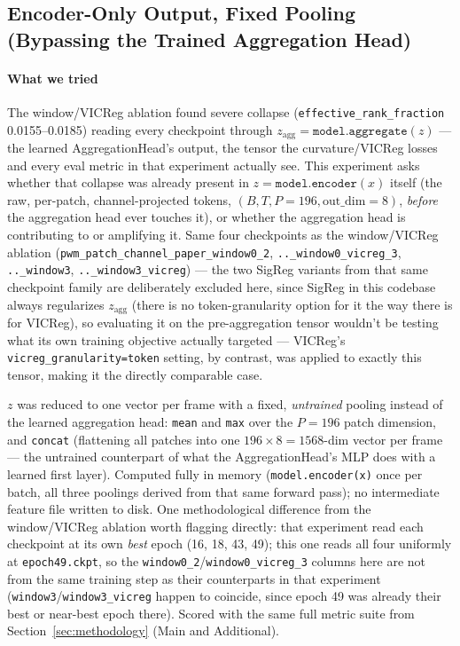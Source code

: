 \subsection{Encoder-Only Output, Fixed Pooling (Bypassing the Trained Aggregation Head)}
\label{exp:encoder-only-pooling}

\paragraph{What we tried} The window/VICReg ablation found severe collapse
(\texttt{effective\_rank\_fraction} 0.0155--0.0185) reading every checkpoint through
$z_{\mathrm{agg}} = \texttt{model.aggregate}(z)$ --- the learned AggregationHead's
output, the tensor the curvature/VICReg losses and every eval metric in that experiment
actually see. This experiment asks whether that collapse was already present in
$z = \texttt{model.encoder}(x)$ itself (the raw, per-patch, channel-projected tokens,
$(B,T,P{=}196,\text{out\_dim}{=}8)$, \emph{before} the aggregation head ever touches it),
or whether the aggregation head is contributing to or amplifying it. Same four
checkpoints as the window/VICReg ablation
(\texttt{pwm\_patch\_channel\_paper\_window0\_2}, \texttt{..\_window0\_vicreg\_3},
\texttt{..\_window3}, \texttt{..\_window3\_vicreg}) --- the two SigReg variants from that
same checkpoint family are deliberately excluded here, since SigReg in this codebase
always regularizes $z_{\mathrm{agg}}$ (there is no token-granularity option for it the
way there is for VICReg), so evaluating it on the pre-aggregation tensor wouldn't be
testing what its own training objective actually targeted --- VICReg's
\texttt{vicreg\_granularity=token} setting, by contrast, was applied to exactly this
tensor, making it the directly comparable case.

$z$ was reduced to one vector per frame with a fixed, \emph{untrained} pooling instead of
the learned aggregation head: \texttt{mean} and \texttt{max} over the $P{=}196$ patch
dimension, and \texttt{concat} (flattening all patches into one $196{\times}8{=}1568$-dim
vector per frame --- the untrained counterpart of what the AggregationHead's MLP does
with a learned first layer). Computed fully in memory (\texttt{model.encoder(x)} once per
batch, all three poolings derived from that same forward pass); no intermediate feature
file written to disk. One methodological difference from the window/VICReg ablation
worth flagging directly: that experiment read each checkpoint at its own \emph{best}
epoch (16, 18, 43, 49); this one reads all four uniformly at \texttt{epoch49.ckpt}, so
the \texttt{window0\_2}/\texttt{window0\_vicreg\_3} columns here are not from the same
training step as their counterparts in that experiment (\texttt{window3}/\texttt{window3\_vicreg}
happen to coincide, since epoch 49 was already their best or near-best epoch there).
Scored with the same full metric suite from Section~\ref{sec:methodology} (Main and
Additional).

